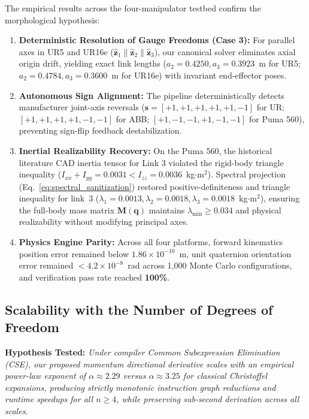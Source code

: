\documentclass[fleqn,10pt]{article}
\begin{document}
The empirical results across the four-manipulator testbed confirm the morphological hypothesis:
\begin{enumerate}
	\item \textbf{Deterministic Resolution of Gauge Freedoms (Case 3):} For parallel axes in UR5 and UR16e ($\hat{\bm{z}}_1 \parallel \hat{\bm{z}}_2 \parallel \hat{\bm{z}}_3$), our canonical solver eliminates axial origin drift, yielding exact link lengths ($a_2 = 0.4250, a_3 = 0.3923$~m for UR5; $a_2 = 0.4784, a_3 = 0.3600$~m for UR16e) with invariant end-effector poses.
	\item \textbf{Autonomous Sign Alignment:} The pipeline deterministically detects manufacturer joint-axis reversals ($\bm{s} = [+1, +1, +1, +1, +1, -1]$ for UR; $[+1, +1, +1, +1, -1, -1]$ for ABB; $[+1, -1, -1, +1, -1, -1]$ for Puma 560), preventing sign-flip feedback destabilization.
	\item \textbf{Inertial Realizability Recovery:} On the Puma 560, the historical literature CAD inertia tensor for Link 3 violated the rigid-body triangle inequality ($I_{xx} + I_{yy} = 0.0031 < I_{zz} = 0.0036$~kg$\cdot$m$^2$). Spectral projection (Eq.~\eqref{eq:spectral_sanitization}) restored positive-definiteness and triangle inequality for link~3 ($\lambda_1 = 0.0013, \lambda_2 = 0.0018, \lambda_3 = 0.0018$~kg$\cdot$m$^2$), ensuring the full-body mass matrix $\bm{M}(\bm{q})$ maintains $\lambda_{\min} \ge 0.034$ and physical realizability without modifying principal axes.
	\item \textbf{Physics Engine Parity:} Across all four platforms, forward kinematics position error remained below $1.86 \times 10^{-10}$~m, unit quaternion orientation error remained $<4.2 \times 10^{-8}$~rad across 1,000 Monte Carlo configurations, and verification pass rate reached \textbf{100\%}.
\end{enumerate}

\subsection{Scalability with the Number of Degrees of Freedom}

\noindent\textbf{Hypothesis Tested:} \textit{Under compiler Common Subexpression Elimination (CSE), our proposed momentum directional derivative scales with an empirical power-law exponent of $\alpha \approx 2.29$ versus $\alpha \approx 3.25$ for classical Christoffel expansions, producing strictly monotonic instruction graph reductions and runtime speedups for all $n \ge 4$, while preserving sub-second derivation across all scales.}
\end{document}
